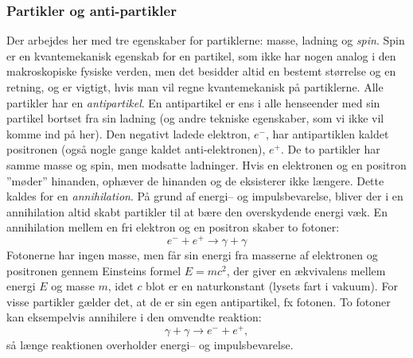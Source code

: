 \subsubsection{Partikler og anti-partikler}
Der arbejdes her med tre egenskaber for partiklerne: masse, ladning og
\emph{spin}. Spin er en kvantemekanisk egenskab for en partikel, som
ikke har nogen analog i den makroskopiske fysiske verden\footnotemark,
men det besidder altid en bestemt størrelse og en retning, og er
vigtigt, hvis man vil regne kvantemekanisk på partiklerne.
Alle partikler har en \emph{antipartikel}. En antipartikel er ens i
alle henseender med sin partikel bortset fra sin ladning (og andre
tekniske egenskaber, som vi ikke vil komme ind på her). Den negativt
ladede elektron, $e^-$, har antipartiklen kaldet positronen (også
nogle gange kaldet anti-elektronen), $e^+$. De to partikler har samme
masse og spin, men modsatte ladninger. Hvis en elektronen og en
positron ''møder'' hinanden, ophæver de hinanden og de eksisterer ikke
længere. Dette kaldes for en \emph{annihilation}. På grund af energi--
og impulsbevarelse, bliver der i en annihilation altid skabt partikler
til at bære den overskydende energi væk. En annihilation mellem en fri
elektron og en positron skaber to fotoner:
\begin{equation}
e^- + e^+ \rightarrow \gamma + \gamma 
\end{equation}
Fotonerne har ingen masse, men får sin energi fra masserne af
elektronen og positronen gennem Einsteins formel $E=mc^2$, der giver
en ækvivalens mellem energi $E$ og masse $m$, idet $c$ blot er en
naturkonstant (lysets fart i vakuum). For visse partikler gælder det,
at de er sin egen antipartikel, fx fotonen. To fotoner kan eksempelvis
annihilere i den omvendte reaktion:
\begin{equation}
\gamma + \gamma \rightarrow e^- + e^+,
\end{equation}
så længe reaktionen overholder energi-- og impulsbevarelse.


